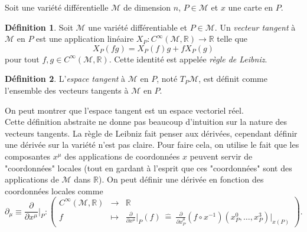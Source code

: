\documentclass[a4paper,11pt]{report}
\theoremstyle{definition}
\theoremstyle{plain}
\theoremstyle{definition}
\newtheorem{defn}{Définition}[chapter]
\theoremstyle{remark}
\newcommand{\M}{\mathscr{M}}
\newcommand{\p}{\partial}
\begin{document}
                Soit une variété différentielle $\M$ de dimension $n$, $P\in\M$ et $x$ une carte en $P$.\\
                
                \begin{defn}
                    Soit $\M$ une variété différentiable et $P\in\M$. Un \textit{vecteur tangent} à $\M$ en $P$ est une application linéaire $X_P:C^\infty(\M,\mathbb{R})\to\mathbb{R}$ telle que
                    \begin{equation}
                        X_P(fg) = X_P(f)g+fX_P(g)
                    \end{equation}
                    pour tout $f,g\in C^\infty(\M,\mathbb{R})$. Cette identité est appelée \textit{règle de Leibniz}.
                \end{defn}
                
                \begin{defn}
                    L'\textit{espace tangent} à $\M$ en $P$, noté $T_P\M$, est définit comme l'ensemble des vecteurs tangents à $\M$ en $P$.
                \end{defn}
                On peut montrer que l'espace tangent est un espace vectoriel réel.\\
                
                Cette définition abstraite ne donne pas beaucoup d'intuition sur la nature des vecteurs tangents. La règle de Leibniz fait penser aux dérivées, cependant définir une dérivée sur la variété n'est pas claire. Pour faire cela, on utilise le fait que les composantes $x^\mu$ des applications de coordonnées $x$ peuvent servir de "coordonnées" locales (tout en gardant à l'esprit que ces "coordonnées" sont des applications de $\M$ dans $\mathbb{R}$). On peut définir une dérivée en fonction des coordonnées locales comme
                \begin{equation}
                \p_\mu\equiv\frac{\p}{\p x^\mu}\bigg|_P:\left(
                \begin{array}{ccc}
                    C^\infty(\M,\mathbb{R}) & \longrightarrow & \mathbb{R} \\
                    f & \longmapsto & \frac{\p}{\p x^\mu}\bigg|_P(f) ~\hat{=}~ \frac{\p}{\p x^\mu_P}(f\circ x^{-1})(x^0_P,\dots,x^3_P)\big|_{x(P)}
                \end{array}
                \right).
                \end{equation}
                
\end{document}
